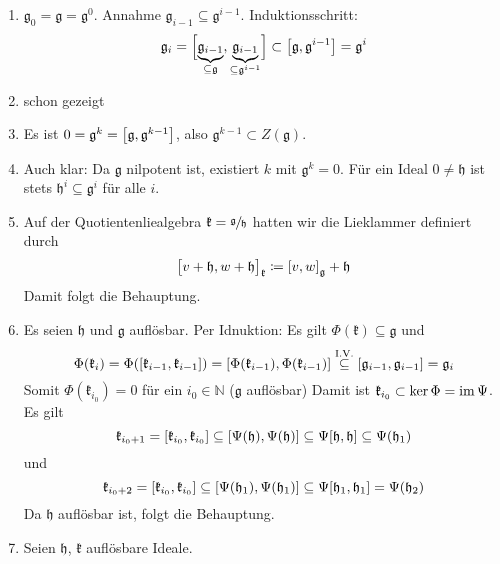 \begin{beweis}
	\begin{enumerate}[1)]
		\item $\mathfrak{g}_0 = \mathfrak{g} = \mathfrak{g}^0$.
		Annahme $\mathfrak{g}_{i-1} \subseteq \mathfrak{g}^{i-1}$. Induktionsschritt:
		\[
			\mathfrak{g}_i = \benbrace[\Big]{\Underbrace{\mathfrak{g}_{i-1}}{\subseteq \mathfrak{g}}, \Underbrace{\mathfrak{g}_{i-1}}{\subseteq \mathfrak{g}^{i-1}}} \subset \benbrace*{\mathfrak{g},\mathfrak{g}^{i-1}} = \mathfrak{g}^i
		\]
		\item schon gezeigt
		\item Es ist $0 = \mathfrak{g}^k = \benbrace*{\mathfrak{g}, \mathfrak{g}^{k-1}}$, also $\mathfrak{g}^{k-1} \subset Z(\mathfrak{g})$.
		\item Auch klar: Da $\mathfrak{g}$ nilpotent ist, existiert $k$ mit $\mathfrak{g}^k =0$.
		Für ein Ideal $0 \neq \mathfrak{h}$ ist stets $\mathfrak{h}^i \subseteq \mathfrak{g}^i$ für alle $i$.
		\item Auf der Quotientenliealgebra $\mathfrak{k} = \sfrac{\mathfrak{g}}{\mathfrak{h}}$ hatten wir die Lieklammer definiert durch
		\[
			\benbrace[\big]{v +\mathfrak{h}, w + \mathfrak{h}}_{\mathfrak{k}} \coloneqq \benbrace*{v,w}_{\mathfrak{g}} + \mathfrak{h} 
		\]
		Damit folgt die Behauptung.
		\item Es seien $\mathfrak{h}$ und $\mathfrak{g}$ auflösbar. Per Idnuktion:
		Es gilt $\Phi(\mathfrak{k}) \subseteq \mathfrak{g}$ und 
		\[
			\Phi(\mathfrak{k}_i) = \Phi \enbrace*{\benbrace*{\mathfrak{k}_{i-1}, \mathfrak{k}_{i-1}}} = \benbrace*{\Phi(\mathfrak{k}_{i-1}), \Phi(\mathfrak{k}_{i-1})}\StackText{I.V.}{\subseteq} \benbrace*{\mathfrak{g}_{i-1}, \mathfrak{g}_{i-1}} = \mathfrak{g}_i
		\]
		Somit $\Phi(\mathfrak{k}_{i_0})=0$ für ein $i_0 \in \mathbb{N}$ ($\mathfrak{g}$ auflösbar)
		Damit ist $\mathfrak{k}_{i_0} \subset \ker \Phi = \im \Psi$. 
		Es gilt
		\[
			\mathfrak{k}_{i_0 +1} = \benbrace*{\mathfrak{k}_{i_0}, \mathfrak{k}_{i_0}} \subseteq \benbrace*{\Psi(\mathfrak{h}), \Psi(\mathfrak{h})} \subseteq \Psi \benbrace*{\mathfrak{h},\mathfrak{h}} \subseteq \Psi(\mathfrak{h}_1)
		\]
		und 
		\[
			\mathfrak{k}_{i_0+2} = \benbrace*{\mathfrak{k}_{i_0}, \mathfrak{k}_{i_0}} \subseteq \benbrace*{\Psi(\mathfrak{h}_1), \Psi(\mathfrak{h}_1)} \subseteq \Psi \benbrace*{\mathfrak{h}_1, \mathfrak{h}_1} = \Psi(\mathfrak{h}_2)
		\]
		Da $\mathfrak{h}$ auflösbar ist, folgt die Behauptung.
		\item Seien $\mathfrak{h}$, $\mathfrak{k}$ auflösbare Ideale.

\end{enumerate}
\end{beweis}
